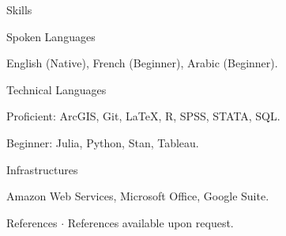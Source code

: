 \documentclass[10pt]{resume} %
\begin{document}
	\begin{rSection}{Skills} \itemsep -5pt
		
		\begin{rSubsection}{Spoken Languages}{}{}
			
			\item English (Native), French (Beginner), Arabic (Beginner).
		
		\end{rSubsection}
		
		\begin{rSubsection}{Technical Languages}{}{}
			
			\item Proficient: ArcGIS, Git, \LaTeX, R, SPSS, STATA, SQL.
			
			\item Beginner: Julia, Python, Stan, Tableau.
		
		\end{rSubsection}
		
		\begin{rSubsection}{Infrastructures}{}{}
			
			\item Amazon Web Services, Microsoft Office, Google Suite.
		
		\end{rSubsection}
		
	\end{rSection}
	
	\begin{rSection}{References}
		$\cdot$ References available upon request. 
	\end{rSection}
	
\end{document}
